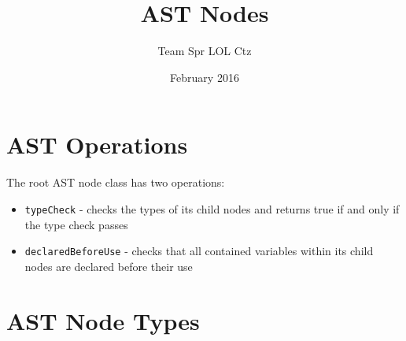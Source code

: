 \documentclass{article}
\title{AST Nodes}
\author{Team Spr LOL Ctz}
\date{February 2016}
\begin{document}
\maketitle

\section{AST Operations}
The root AST node class has two operations:
\begin{itemize}
    \item \texttt{typeCheck} - checks the types of its child nodes and returns true if and only if the type check passes
    \item \texttt{declaredBeforeUse} - checks that all contained variables within its child nodes are declared before their use
\end{itemize}
\section{AST Node Types}
\end{document}
